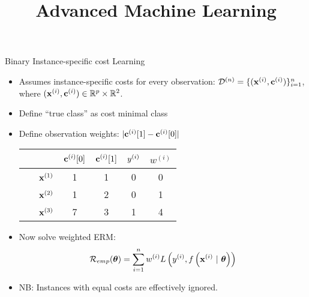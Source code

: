 \documentclass[11pt,compress,t,notes=noshow, xcolor=table]{beamer}
\title{Advanced Machine Learning}
\date{}
\begin{document}



\sloppy





\begin{vbframe}{Binary Instance-specific cost Learning}
    \begin{itemize}
        \item Assumes instance-specific costs for every observation:  $\mathcal{D}^{(n)} = \{(\mathbf{x}^{(i)}, \mathbf{c}^{(i)})\}_{i=1}^n$, where $(\mathbf{x}^{(i)}, \mathbf{c}^{(i)}) \in \mathbb{R}^p \times \mathbb{R}^2$.

        \item Define ``true class'' as cost minimal class
        
        \item Define observation weights: $|\mathbf{c}^{(i)}[1] - \mathbf{c}^{(i)}[0]|$

        \begin{center}
            \begin{tabular}{cc|cccc}\
        			& & $\mathbf{c}^{(i)}[0]$ & $\mathbf{c}^{(i)}[1]$ & $y^{(i)}$ & $w^{(i)}$ \\
        			\hline & $\mathbf{x}^{(1)}$ & 1 & 1 & 0 & 0\\
        			& $\mathbf{x}^{(2)}$ & 1 & 2 & 0 & 1\\
        			& $\mathbf{x}^{(3)}$ & 7 & 3 & 1 & 4\\
            \end{tabular}
        \end{center}

        \item Now solve weighted ERM:
        \begin{equation*}
            \mathcal{R}_{emp}(\boldsymbol{\theta}) = \sum_{i=1}^{n}w^{(i)} L\left(y^{(i)}, f\left(\mathbf{x}^{(i)} ~|~ \bm{\theta}\right)\right)
        \end{equation*}
        
        \item NB: Instances with equal costs are effectively ignored.
        \end{itemize}
            
\end{vbframe}
\end{document}
